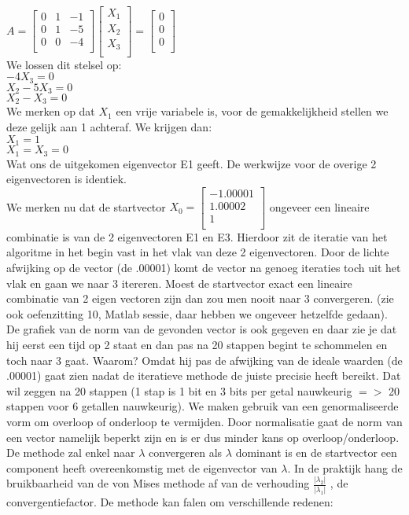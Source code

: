 \documentclass[examenvragen.tex]{subfiles}
\begin{document}
$ A =\begin{bmatrix} 
 0 & 1 & -1 \\
 0 & 1 & -5 \\
 0 & 0 & -4\\
\end{bmatrix} \begin{bmatrix}
X_1 \\
X_2 \\
X_3 \\
\end{bmatrix} = \begin{bmatrix}
0 \\
0 \\
0 \\
\end{bmatrix} $ \\
We lossen dit stelsel op: \\
$-4X_3 = 0 $ \\
$X_2 - 5X_3 = 0 $ \\
$X_2 - X_3 = 0 $ \\
We merken op dat $X_1$ een vrije variabele is, voor de gemakkelijkheid stellen we deze gelijk aan 1 achteraf.
We krijgen dan: \\
$X_1 = 1 $ \\
$X_1 = X_3 = 0 $ \\
Wat ons de uitgekomen eigenvector E1 geeft. De werkwijze voor de overige 2 eigenvectoren is identiek. \\
We merken nu dat de startvector 
$ X_0 = \begin{bmatrix}
-1.00001 \\
1.00002 \\
1 \\
\end{bmatrix} $
ongeveer een lineaire combinatie is van de 2 eigenvectoren E1 en E3. Hierdoor zit de iteratie van het algoritme in het begin vast in het vlak van deze 2 eigenvectoren. Door de lichte afwijking op de vector (de .00001) komt de vector na genoeg iteraties toch uit het vlak en gaan we naar 3 itereren. Moest de startvector exact een lineaire combinatie van 2 eigen vectoren zijn dan zou men nooit naar 3 convergeren. (zie ook oefenzitting 10, Matlab sessie, daar hebben we ongeveer hetzelfde gedaan). De grafiek van de norm van de gevonden vector is ook gegeven en daar zie je dat hij eerst een tijd op 2 staat en dan pas na 20 stappen begint te schommelen en toch naar 3 gaat. Waarom? Omdat hij pas de afwijking van de ideale waarden (de .00001) gaat zien nadat de iteratieve methode de juiste precisie heeft bereikt. Dat wil zeggen na 20 stappen (1 stap is 1 bit en 3 bits per getal nauwkeurig $=>$ 20 stappen voor 6 getallen nauwkeurig). We maken gebruik van een genormaliseerde vorm om overloop of onderloop te vermijden. Door normalisatie gaat de norm van een vector namelijk beperkt zijn en is er dus minder kans op overloop/onderloop. De methode zal enkel naar $\lambda$ convergeren als $\lambda$ dominant is en de startvector een component heeft overeenkomstig met de eigenvector van $\lambda$. In de praktijk hang de bruikbaarheid van de von Mises methode af van de verhouding $\frac{| \lambda_2 |}{| \lambda_1 |}$ , de convergentiefactor. De methode kan falen om verschillende redenen: \\
\end{document}
